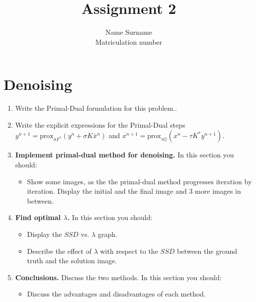 \documentclass{paper}
\title{Assignment 2}
\author{Name Surname\\Matriculation number}
\begin{document}
\maketitle


%

\section*{Denoising}


\begin{enumerate}

\item Write the Primal-Dual formulation for this problem..

\item Write the explicit expressions for the Primal-Dual steps $y^{n+1} = \text{prox}_{\sigma F^*} (y^n + \sigma K \bar{x}^n)$ and $x^{n+1} = \text{prox}_{\tau G} (x^n  - \tau K^* y^{n+1})$.


\item \textbf{Implement primal-dual method for denoising.} In this section you should:

\begin{itemize}
\item Show some images, as the the primal-dual method progresses iteration by iteration. Display the initial and the final image and 3 more images in between.
\end{itemize}
\item \textbf{ Find optimal $\lambda$.} In this section you should:

\begin{itemize}
\item Display the $SSD$ vs. $\lambda$ graph.
\item Describe the effect of $\lambda$ with respect to the $SSD$ between the ground truth and the solution image.
\end{itemize}

\item \textbf{ Conclusions.} Discuss the two methods. In this section you should:
\begin{itemize}
\item Discuss the advantages and disadvantages of each method.
\end{itemize}
\end{enumerate}

 
\end{document}
